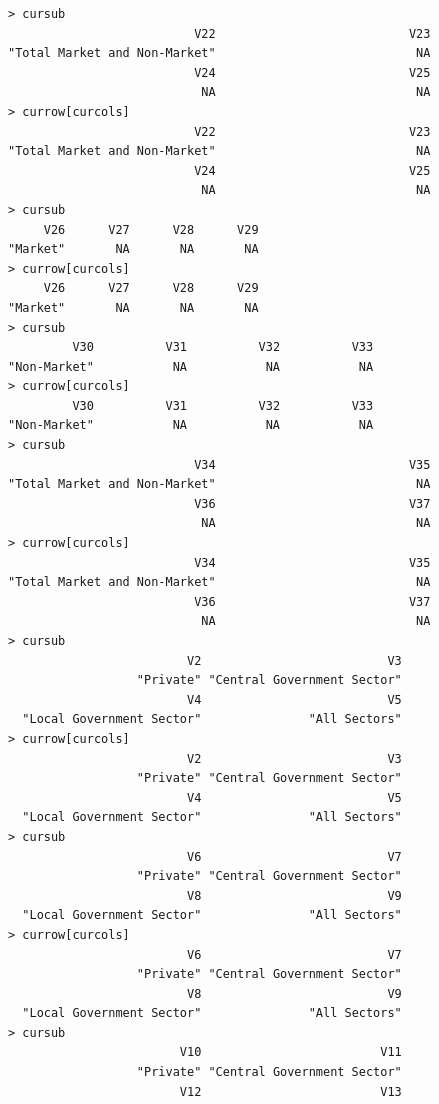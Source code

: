 \documentclass[a4paper]{article}
\begin{document}
\begin{verbatim}
> cursub 
                          V22                           V23 
"Total Market and Non-Market"                            NA 
                          V24                           V25 
                           NA                            NA 
> currow[curcols] 
                          V22                           V23 
"Total Market and Non-Market"                            NA 
                          V24                           V25 
                           NA                            NA 
> cursub 
     V26      V27      V28      V29 
"Market"       NA       NA       NA 
> currow[curcols] 
     V26      V27      V28      V29 
"Market"       NA       NA       NA 
> cursub 
         V30          V31          V32          V33 
"Non-Market"           NA           NA           NA 
> currow[curcols] 
         V30          V31          V32          V33 
"Non-Market"           NA           NA           NA 
> cursub 
                          V34                           V35 
"Total Market and Non-Market"                            NA 
                          V36                           V37 
                           NA                            NA 
> currow[curcols] 
                          V34                           V35 
"Total Market and Non-Market"                            NA 
                          V36                           V37 
                           NA                            NA 
> cursub 
                         V2                          V3 
                  "Private" "Central Government Sector" 
                         V4                          V5 
  "Local Government Sector"               "All Sectors" 
> currow[curcols] 
                         V2                          V3 
                  "Private" "Central Government Sector" 
                         V4                          V5 
  "Local Government Sector"               "All Sectors" 
> cursub 
                         V6                          V7 
                  "Private" "Central Government Sector" 
                         V8                          V9 
  "Local Government Sector"               "All Sectors" 
> currow[curcols] 
                         V6                          V7 
                  "Private" "Central Government Sector" 
                         V8                          V9 
  "Local Government Sector"               "All Sectors" 
> cursub 
                        V10                         V11 
                  "Private" "Central Government Sector" 
                        V12                         V13 

\end{verbatim}
\end{document}

